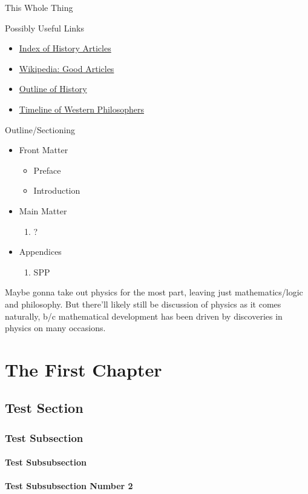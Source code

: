 \documentclass[./thoughthist.tex]{subfiles}
\begin{document}
\unnumpart{\bookfulltitle}

\begin{somenotes}{This Whole Thing}
    \item Possibly Useful Links
    \begin{itemize}
        \item \href{https://www.wikiwand.com/en/Index_of_history_articles}{Index of History Articles}
        \item \href{https://en.wikipedia.org/wiki/Wikipedia:Good_articles}{Wikipedia: Good Articles}
        \item \href{https://www.wikiwand.com/en/Outline_of_history}{Outline of History}
        \item \href{https://www.wikiwand.com/en/Timeline_of_Western_philosophers}{Timeline of Western Philosophers}
    \end{itemize}
    \item Outline\slash Sectioning
    \begin{itemize}
        \item Front Matter
        \begin{itemize}
            \item Preface
            \item Introduction
        \end{itemize}
        \item Main Matter
        \begin{enumerate}
            \item ?
        \end{enumerate}
        \item Appendices
        \begin{enumerate}[label=\Alph*)]
            \item SPP
        \end{enumerate}
    \end{itemize}
    \item Maybe gonna take out physics for the most part, leaving just mathematics\slash logic and philosophy. But there'll likely still be discussion of physics as it comes naturally, b\slash c mathematical development has been driven by discoveries in physics on many occasions.
\end{somenotes}

\chapter{The First Chapter}
\newpage

\section{Test Section}
\Blindtext

\blindtext
\subsection{Test Subsection}
\blindtext

\subsubsection{Test Subsubsection}
\blindtext

\subsubsection{Test Subsubsection Number 2}
\blindtext
\end{document}
